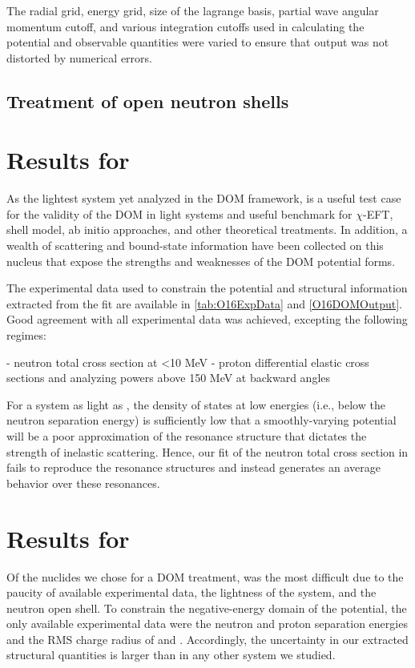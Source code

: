 The radial grid, energy grid, size of the lagrange basis, partial wave angular momentum cutoff, and
various integration cutoffs used in calculating the potential and
observable quantities were varied to ensure that output was not distorted by numerical errors. 

\subsection{Treatment of open neutron shells}

\section{Results for \oSix}
As the lightest system yet analyzed in the DOM framework, \oSix is a useful test case
for the validity of the DOM in light systems and useful benchmark for $\chi$-EFT, shell model, ab
initio approaches, and other theoretical treatments. In addition, a wealth of scattering and
bound-state information have been collected on this nucleus that expose the strengths and
weaknesses of the DOM potential forms.

The experimental data used to constrain the \oSix potential and structural information extracted
from the fit are available in \ref{tab:O16ExpData} and \ref{O16DOMOutput}. Good agreement with all 
experimental data was achieved, excepting the following regimes:

- neutron total cross section at <10 MeV
- proton differential elastic cross sections and analyzing powers above 150 MeV at backward angles

For a system as light as \oSix, the density of states at low energies (i.e., below the neutron
separation energy) is sufficiently low that a smoothly-varying potential will be a poor
approximation of the resonance structure that dictates the strength of inelastic scattering. Hence,
our fit of the neutron total cross section in \oSix fails to reproduce the resonance structures and
instead generates an average behavior over these resonances.

\section{Results for \oEight}
Of the nuclides we chose for a DOM treatment, \oEight was the most difficult due to the paucity of
available experimental data, the lightness of the system, and the neutron open shell. To constrain the negative-energy domain
of the potential, the only available experimental data were the neutron and proton separation
energies and the RMS charge radius of \oEight and \neEight. Accordingly, the uncertainty in our extracted structural quantities is
larger than in any other system we studied.

